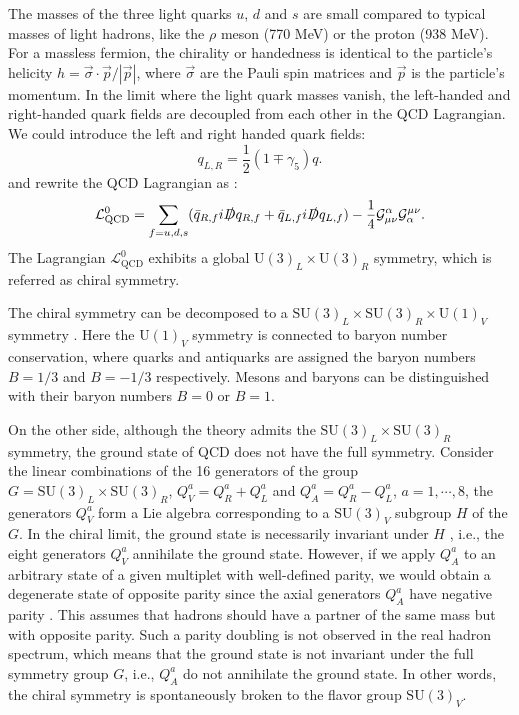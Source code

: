The masses of the three light quarks $u$, $d$ and $s$ are small compared to typical masses of light hadrons, like the $\rho$ meson (770 MeV) or the proton (938 MeV). For a massless fermion, the chirality or handedness is identical to the particle's helicity $h = \vec{\sigma}\cdot\vec{p}/|\vec{p}|$, where $\vec{\sigma}$ are the Pauli spin matrices and $\vec{p}$ is the particle's momentum. In the limit where the light quark masses vanish, the left-handed and right-handed quark fields are decoupled from each other in the QCD Lagrangian. We could introduce the left and right handed quark fields:
\begin{equation}\label{C3S1SS1E2}
q_{L,R} = \frac{1}{2}(1\mp\gamma_5)q.
\end{equation}
and rewrite the QCD Lagrangian as \cite{Scherer2003}:
\begin{equation} \label{C3S1SS1E3}
\mathcal{L}_{\mathrm{QCD}}^0 = \sum_{f=u,d,s}(\bar{q}_{R,f}i\slashed{D}q_{R,f}+\bar{q}_{L,f}i\slashed{D}q_{L,f})-\frac{1}{4}\mathcal{G}_{\mu\nu}^\alpha\mathcal{G}_\alpha^{\mu\nu}.
\end{equation}
The Lagrangian $\mathcal{L}_{\mathrm{QCD}}^0$ exhibits a global $\mathrm{U}(3)_L\times\mathrm{U}(3)_R$ symmetry, which is referred as chiral symmetry.

The chiral symmetry can be decomposed to a $\mathrm{SU}(3)_L\times\mathrm{SU}(3)_R\times\mathrm{U}(1)_V$ symmetry \cite{Scherer2003}. Here the $\mathrm{U}(1)_V$ symmetry is connected to baryon number conservation, where quarks and antiquarks are assigned the baryon numbers $B=1/3$ and $B=-1/3$ respectively. Mesons and baryons can be distinguished with their baryon numbers $B=0$ or $B=1$.

On the other side, although the theory admits the $\mathrm{SU}(3)_L\times\mathrm{SU}(3)_R$ symmetry, the ground state of QCD does not have the full symmetry. Consider the linear combinations of the 16 generators of the group $G=\mathrm{SU}(3)_L\times\mathrm{SU}(3)_R$, $Q_V^a=Q_R^a+Q_L^a$ and $Q_A^a=Q_R^a-Q_L^a$, $a=1,\cdots,8$, the generators $Q_V^a$ form a Lie algebra corresponding to a $\mathrm{SU}(3)_V$ subgroup $H$ of the $G$. In the chiral limit, the ground state is necessarily invariant under $H$ \cite{Vafa1984}, i.e., the eight generators $Q_V^a$ annihilate the ground state. However, if we apply $Q_A^a$ to an arbitrary state of a given multiplet with well-defined parity, we would obtain a degenerate state of opposite parity since the axial generators $Q_A^a$ have negative parity \cite{Scherer2003}. This assumes that hadrons should have a partner of the same mass but with opposite parity. Such a parity doubling is not observed in the real hadron spectrum, which means that the ground state is not invariant under the full symmetry group $G$, i.e., $Q_A^a$ do not annihilate the ground state. In other words, the chiral symmetry is spontaneously broken to the flavor group $\mathrm{SU}(3)_V$.

